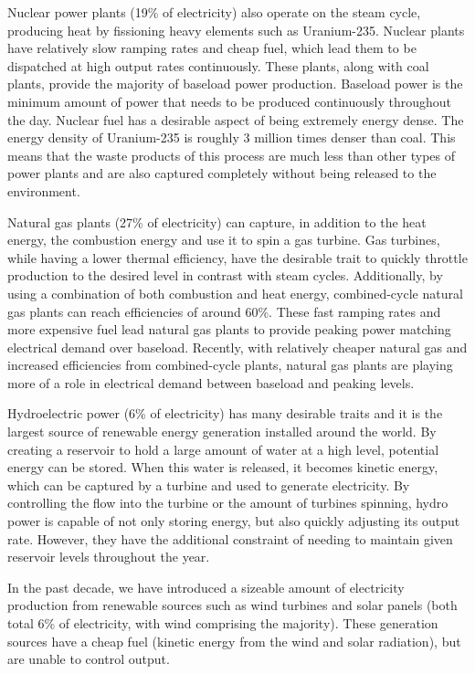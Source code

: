 	Nuclear power plants (19\% of electricity) also operate on the steam cycle, producing heat by fissioning heavy elements such as Uranium-235.  Nuclear plants have relatively slow ramping rates and cheap fuel, which lead them to be dispatched at high output rates continuously.  These plants, along with coal plants, provide the majority of baseload power production. Baseload power is the minimum amount of power that needs to be produced continuously throughout the day.  Nuclear fuel has a desirable aspect of being extremely energy dense.  The energy density of Uranium-235 is roughly 3 million times denser than coal.  This means that the waste products of this process are much less than other types of power plants and are also captured completely without being released to the environment.

	Natural gas plants (27\% of electricity) can capture, in addition to the heat energy, the combustion energy and use it to spin a gas turbine.  Gas turbines, while having a lower thermal efficiency, have the desirable trait to quickly throttle production to the desired level in contrast with steam cycles.  Additionally, by using a combination of both combustion and heat energy, combined-cycle natural gas plants can reach efficiencies of around 60\%.  These fast ramping rates and more expensive fuel lead natural gas plants to provide peaking power matching electrical demand over baseload.  Recently, with relatively cheaper natural gas and increased efficiencies from combined-cycle plants, natural gas plants are playing more of a role in electrical demand between baseload and peaking levels.    

	Hydroelectric power (6\% of electricity) has many desirable traits and it is the largest source of renewable energy generation installed around the world.  By creating a reservoir to hold a large amount of water at a high level, potential energy can be stored.  When this water is released, it becomes kinetic energy, which can be captured by a turbine and used to generate electricity.  By controlling the flow into the turbine or the amount of turbines spinning, hydro power is capable of not only storing energy, but also quickly adjusting its output rate.  However, they have the additional constraint of needing to maintain given reservoir levels throughout the year.

	In the past decade, we have introduced a sizeable amount of electricity production from renewable sources such as wind turbines and solar panels (both total 6\% of electricity, with wind comprising the majority).  These generation sources have a cheap fuel (kinetic energy from the wind and solar radiation), but are unable to control output.  

